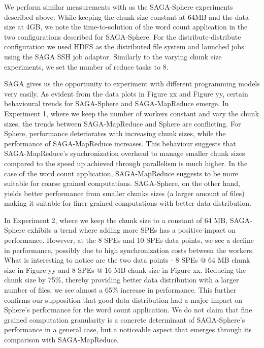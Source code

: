 \documentclass[3p,twocolumn]{elsarticle}
\begin{document}
We perform similar measurements with \sagamapreduce as the SAGA-Sphere experiments
described above.  While keeping the chunk size constant at 64MB and the
data size at 4GB, we note the time-to-solution of the word count application
in the two configurations described for SAGA-Sphere.  For the
distribute-distribute configuration we used HDFS as the distributed file
system and launched jobs using the SAGA SSH job adaptor.  Similarly to the
varying chunk size experiments, we set the number of reduce tasks to 8.

SAGA gives us the opportunity to experiment with different programming models very easily. 
As evident from the data plots in Figure xx and Figure yy, certain behavioural 
trends for SAGA-Sphere and SAGA-MapReduce emerge.  In Experiment 1, where we keep the 
number of workers constant and vary the chunk sizes, the trends between 
SAGA-MapReduce and Sphere are conflicting. For Sphere, performance deteriorates with 
increasing chunk sizes, while the performance of SAGA-MapReduce increases. This behaviour
suggests that SAGA-MapReduce's synchronization overhead to manage smaller 
chunk sizes compared to the speed up achieved through parallelism is much higher. 
In the case of the word count application, SAGA-MapReduce suggests to be more 
suitable for coarse grained computations. SAGA-Sphere, on the other hand, yields 
better performance from smaller chunks sizes (a larger amount of files) making it 
suitable for finer grained computations with better data distribution.

In Experiment 2, where we keep the chunk size to a constant of 64 MB, SAGA-Sphere 
exhibits a trend where adding more SPEs has a positive impact on performance. However, 
at the 8 SPEs and 10 SPEs data points, we see a decline in performance, possibly 
due to high synchronization costs between the workers. What is interesting to 
notice are the two data points - 8 SPEs @ 64 MB chunk size in Figure yy 
and 8 SPEs @ 16 MB chunk size in Figure xx. Reducing the chunk size by 75\%, 
thereby providing better data distribution with a larger number of files, we 
see almost a 65\% increase in performance. This further confirms our 
supposition that good data distribution had a major impact on Sphere's performance for
the word count application. We do not claim that fine grained computation 
granularity is a concrete determinant of SAGA-Sphere's performance in a 
general case, but a noticeable aspect that emerges through its comparison with SAGA-MapReduce. 
\end{document}
